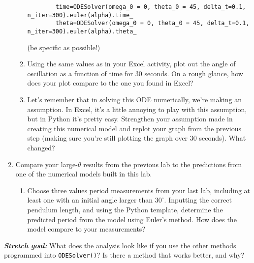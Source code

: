 \documentclass{article}
\begin{document}
\begin{enumerate}
\begin{enumerate}
        \footnotesize
        \begin{verbatim}
        time=ODESolver(omega_0 = 0, theta_0 = 45, delta_t=0.1, n_iter=300).euler(alpha).time_
        theta=ODESolver(omega_0 = 0, theta_0 = 45, delta_t=0.1, n_iter=300).euler(alpha).theta_    
        \end{verbatim}
        \normalsize
        (be specific as possible!)
        \item Using the same values as in your Excel activity, plot out the angle of oscillation as a function of time for 30 seconds. On a rough glance, how does your plot compare to the one you found in Excel?
        \item Let’s remember that in solving this ODE numerically, we’re making an assumption. In Excel, it’s a little annoying to play with this assumption, but in Python it’s pretty easy. Strengthen your assumption made in creating this numerical model and replot your graph from the previous step (making sure you’re still plotting the graph over 30 seconds). What changed?
    \end{enumerate}
    \item Compare your large-$\theta$ results from the previous lab to the predictions from one of the numerical models built in this lab. 
    \begin{enumerate}
        \item Choose three values period measurements from your last lab, including at least one with an initial angle larger than $30^\circ$. Inputting the correct pendulum length, and using the Python template, determine the predicted period from the model using Euler’s method. How does the model compare to your measurements? 
    \end{enumerate}
\end{enumerate}
\textit{\textbf{Stretch goal:}} What does the analysis look like if you use the other methods programmed into \verb!ODESolver()!? Is there a method that works better, and why? 
\end{document}
